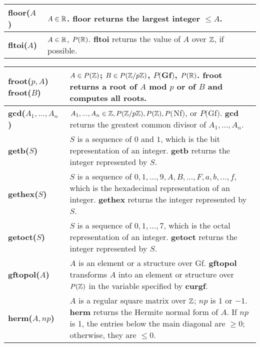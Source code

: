 {\begin{tabular}{|p{1.95in}|p{3.83in}|}
{\bf floor($A$)} &
$A \in \mbox{$\mathbb R$}$.\newline
{\bf floor} returns the largest integer $\leq A$.\\ \hline

{\bf fltoi($A$)} &
$A \in \mbox{$\mathbb R$}$, $P(\mbox{$\mathbb R$})$.\newline
{\bf fltoi} returns the value of $A$ over $\mbox{$\mathbb Z$}$, if possible.\\ \hline
\end{tabular}

\newpage

\begin{tabular}{|p{1.95in}|p{3.83in}|} \hline

{\bf froot($p,A$)}\newline
{\bf froot($B$)} &
$A\in P(\mbox{$\mathbb Z$})$; $B\in P(\mbox{$\mathbb Z$}/p\mbox{$\mathbb Z$})$, $P($Gf$)$, $P(\mbox{$\mathbb R$})$.\newline
{\bf froot} returns a root of $A$ mod $p$ or of $B$ and computes all 
roots.\\ \hline


{\bf gcd($A_1,...,A_n$)} &
$A_1,...,A_n \in \mbox{$\mathbb Z$}, P(\mbox{$\mathbb Z$}/p\mbox{$\mathbb Z$}), P(\mbox{$\mathbb Z$}), P($Nf$)$, or $P($Gf$)$. \newline
{\bf gcd} returns the greatest common divisor of $A_1,...,A_n$.\\ \hline

{\bf getb($S$)} &
$S$ is  a sequence of $0$ and $1$, which is the bit representation of an 
integer.\newline
{\bf getb} returns the integer represented by $S$.\\ \hline

{\bf gethex($S$)} &
$S$ is  a sequence of $0,1,...,9,A,B,...,F,a,b,...,f$, which is the hexadecimal 
representation of an integer. \newline
{\bf gethex} returns the integer represented by $S$.\\ \hline

{\bf getoct($S$)} &
$S$ is  a sequence of $0,1,...,7$, which is the octal re\-pre\-sen\-ta\-tion of 
an integer. \newline
{\bf getoct} returns the integer represented by $S$.\\ \hline

{\bf gftopol($A$)} &
$A$ is an element or a structure over Gf.\newline
{\bf gftopol} transforms $A$ into an element or structure over $P(\mbox{$\mathbb Z$})$ in
the variable specified by {\bf curgf}.\\ \hline

{\bf herm($A,np$)} &
$A$ is a regular square matrix over $\mbox{$\mathbb Z$}$; $np$ is $1$ or $-1$.\newline
{\bf herm} returns the Hermite normal form of $A$. If $np$ is 1, the entries
below the main diagonal are $\geq 0$; otherwise, they are $\leq 0$.\\ \hline


\end{tabular}}

